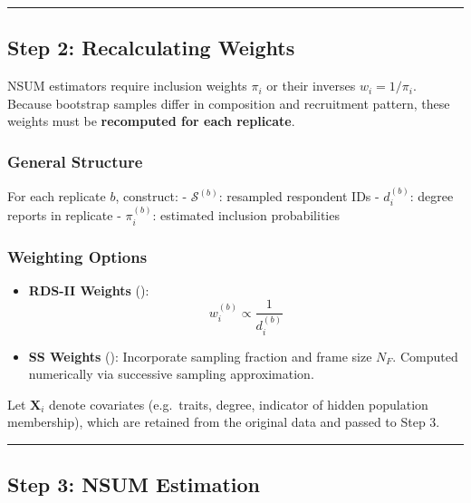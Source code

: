 \documentclass[
  12pt,
  letterpaper,
  DIV=11,
  numbers=noendperiod]{scrartcl}
\theoremstyle{plain}
\theoremstyle{definition}
\begin{document}
\begin{center}\rule{0.5\linewidth}{0.5pt}\end{center}

\subsection{Step 2: Recalculating
Weights}\label{step-2-recalculating-weights}

NSUM estimators require inclusion weights \(\pi_i\) or their inverses
\(w_i = 1 / \pi_i\). Because bootstrap samples differ in composition and
recruitment pattern, these weights must be \textbf{recomputed for each
replicate}.

\subsubsection{General Structure}\label{general-structure}

For each replicate \(b\), construct: - \(\mathcal{S}^{(b)}\): resampled
respondent IDs - \(d_i^{(b)}\): degree reports in replicate -
\(\pi_i^{(b)}\): estimated inclusion probabilities

\subsubsection{Weighting Options}\label{weighting-options}

\begin{itemize}
\item
  \textbf{RDS-II Weights} (\textcite{volz08-simple}): \[
  w_i^{(b)} \propto \frac{1}{d_i^{(b)}}
  \]
\item
  \textbf{SS Weights} (\textcite{gile11-improv}): Incorporate sampling
  fraction and frame size \(N_F\). Computed numerically via successive
  sampling approximation.
\end{itemize}

Let \(\mathbf{X}_i\) denote covariates (e.g.~traits, degree, indicator
of hidden population membership), which are retained from the original
data and passed to Step 3.

\begin{center}\rule{0.5\linewidth}{0.5pt}\end{center}

\subsection{Step 3: NSUM Estimation}\label{step-3-nsum-estimation}
\end{document}
